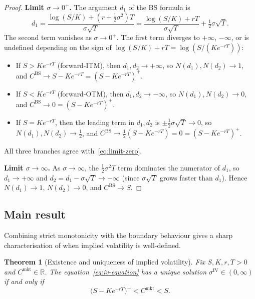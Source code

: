 \documentclass[11pt,a4paper]{article}
\theoremstyle{plain}
\newtheorem{theorem}{Theorem}[section]
\theoremstyle{definition}
\theoremstyle{remark}
\newcommand{\R}{\mathbb{R}}
\newcommand{\BS}{\mathrm{BS}}
\newcommand{\IV}{\mathrm{IV}}
\begin{document}
\begin{proof}
\textbf{Limit \(\sigma \to 0^+\).} The argument \(d_1\) of the BS
formula is
\[
    d_1
    = \frac{\log(S/K) + (r + \tfrac{1}{2}\sigma^2) T}{\sigma\sqrt{T}}
    = \frac{\log(S/K) + r T}{\sigma\sqrt{T}}
        + \tfrac{1}{2}\sigma\sqrt{T}.
\]
The second term vanishes as \(\sigma \to 0^+\). The first term diverges
to \(+\infty\), \(-\infty\), or is undefined depending on the sign of
\(\log(S/K) + r T = \log(S/(Ke^{-rT}))\):

\begin{itemize}
    \item If \(S > K e^{-rT}\) (forward-ITM), then
    \(d_1, d_2 \to +\infty\), so \(N(d_1), N(d_2) \to 1\), and
    \(C^{\BS} \to S - K e^{-rT} = (S - K e^{-rT})^+\).

    \item If \(S < K e^{-rT}\) (forward-OTM), then
    \(d_1, d_2 \to -\infty\), so \(N(d_1), N(d_2) \to 0\), and
    \(C^{\BS} \to 0 = (S - K e^{-rT})^+\).

    \item If \(S = K e^{-rT}\), then the leading term in \(d_1, d_2\)
    is \(\pm \tfrac{1}{2}\sigma\sqrt{T} \to 0\), so
    \(N(d_1), N(d_2) \to \tfrac{1}{2}\), and
    \(C^{\BS} \to \tfrac{1}{2}(S - K e^{-rT}) = 0 = (S - K e^{-rT})^+\).
\end{itemize}
All three branches agree with~\eqref{eq:limit-zero}.

\textbf{Limit \(\sigma \to \infty\).} As \(\sigma \to \infty\), the
\(\tfrac{1}{2}\sigma^2 T\) term dominates the numerator of \(d_1\),
so \(d_1 \to +\infty\) and \(d_2 = d_1 - \sigma\sqrt{T} \to -\infty\)
(since \(\sigma\sqrt{T}\) grows faster than \(d_1\)). Hence
\(N(d_1) \to 1\), \(N(d_2) \to 0\), and
\(C^{\BS} \to S\).
\end{proof}

\subsection{Main result}

Combining strict monotonicity with the boundary behaviour gives a
sharp characterisation of when implied volatility is well-defined.

\begin{theorem}[Existence and uniqueness of implied volatility]
\label{thm:existence}
Fix \(S, K, r, T > 0\) and \(C^{\mathrm{mkt}} \in \R\). The
equation~\eqref{eq:iv-equation} has a unique solution
\(\sigma^{\IV} \in (0, \infty)\) if and only if
\begin{equation}
    \bigl(S - K e^{-rT}\bigr)^+ < C^{\mathrm{mkt}} < S.
    \label{eq:no-arbitrage-bounds}
\end{equation}
\end{theorem}
\end{document}
